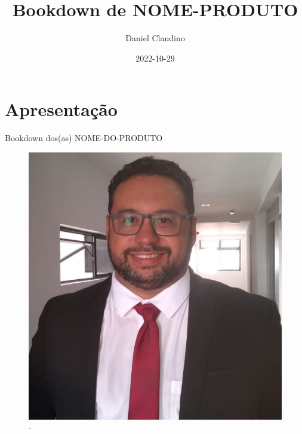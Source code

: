 \documentclass[
]{book}
\title{Bookdown de NOME-PRODUTO}
\author{Daniel Claudino}
\date{2022-10-29}
\begin{document}
\maketitle

{
\setcounter{tocdepth}{1}
\tableofcontents
}
\hypertarget{apresentauxe7uxe3o}{%
\chapter{Apresentação}\label{apresentauxe7uxe3o}}

Bookdown dos(as) NOME-DO-PRODUTO

\begin{figure}

{\centering \includegraphics[width=0.5\linewidth]{imagens/FOTO-PERFIL-DANIEL-CLAUDINO-2020} 

}

\caption{-}\label{fig:unnamed-chunk-1}
\end{figure}
\end{document}
